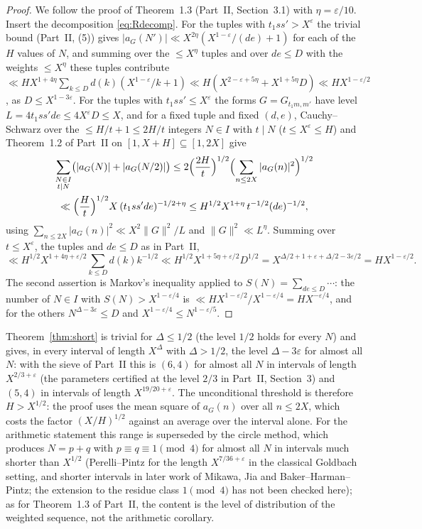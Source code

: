 \documentclass[11pt]{amsart}
\theoremstyle{remark}
\newcommand{\e}{\varepsilon}
\begin{document}
\begin{proof}
We follow the proof of Theorem~1.3 (Part~II, Section~3.1) with $\eta=\e/10$. Insert the decomposition \eqref{eq:Rdecomp}. For the tuples with $t_1ss'>X^\e$ the trivial bound (Part~II, (5)) gives $|a_G(N')|\ll X^{2\eta}(X^{1-\e}/(de)+1)$ for each of the $H$ values of $N$, and summing over the $\le X^\eta$ tuples and over $de\le D$ with the weights $\le X^\eta$ these tuples contribute $\ll HX^{1+4\eta}\sum_{k\le D}d(k)(X^{1-\e}/k+1)\ll H(X^{2-\e+5\eta}+X^{1+5\eta}D)\ll HX^{1-\e/2}$, as $D\le X^{1-3\e}$. For the tuples with $t_1ss'\le X^\e$ the forms $G=G_{t_1m,m'}$ have level $L=4t_1ss'de\le4X^\e D\le X$, and for a fixed tuple and fixed $(d,e)$, Cauchy--Schwarz over the $\le H/t+1\le2H/t$ integers $N\in I$ with $t\mid N$ ($t\le X^\e\le H$) and Theorem~1.2 of Part~II on $[1,X+H]\subseteq[1,2X]$ give
\begin{multline*}
\sum_{\substack{N\in I\\ t\mid N}}\bigl(|a_G(N)|+|a_G(N/2)|\bigr)\le2\Bigl(\frac{2H}t\Bigr)^{1/2}\Bigl(\sum_{n\le2X}|a_G(n)|^2\Bigr)^{1/2}\\
\ll\Bigl(\frac Ht\Bigr)^{1/2}X\,(t_1ss'de)^{-1/2+\eta}\le H^{1/2}X^{1+\eta}\,t^{-1/2}(de)^{-1/2},
\end{multline*}
using $\sum_{n\le2X}|a_G(n)|^2\ll X^2\|G\|^2/L$ and $\|G\|^2\ll L^{\eta}$. Summing over $t\le X^\e$, the tuples and $de\le D$ as in Part~II,
\[
\ll H^{1/2}X^{1+4\eta+\e/2}\sum_{k\le D}d(k)k^{-1/2}\ll H^{1/2}X^{1+5\eta+\e/2}D^{1/2}=X^{\Delta/2+1+\e+\Delta/2-3\e/2}=HX^{1-\e/2}.
\]
The second assertion is Markov's inequality applied to $S(N)=\sum_{de\le D}\cdots$: the number of $N\in I$ with $S(N)>X^{1-\e/4}$ is $\ll HX^{1-\e/2}/X^{1-\e/4}=HX^{-\e/4}$, and for the others $N^{\Delta-3\e}\le D$ and $X^{1-\e/4}\le N^{1-\e/5}$.
\end{proof}

Theorem~\ref{thm:short} is trivial for $\Delta\le1/2$ (the level $1/2$ holds for every $N$) and gives, in every interval of length $X^\Delta$ with $\Delta>1/2$, the level $\Delta-3\e$ for almost all $N$: with the sieve of Part~II this is $(6,4)$ for almost all $N$ in intervals of length $X^{2/3+\e}$ (the parameters certified at the level $2/3$ in Part~II, Section~3) and $(5,4)$ in intervals of length $X^{19/20+\e}$. The unconditional threshold is therefore $H>X^{1/2}$: the proof uses the mean square of $a_G(n)$ over all $n\le2X$, which costs the factor $(X/H)^{1/2}$ against an average over the interval alone. For the arithmetic statement this range is superseded by the circle method, which produces $N=p+q$ with $p\equiv q\equiv1\pmod 4$ for almost all $N$ in intervals much shorter than $X^{1/2}$ (Perelli--Pintz \cite{PP} for the length $X^{7/36+\e}$ in the classical Goldbach setting, and shorter intervals in later work of Mikawa, Jia and Baker--Harman--Pintz; the extension to the residue class $1\pmod4$ has not been checked here); as for Theorem~1.3 of Part~II, the content is the level of distribution of the weighted sequence, not the arithmetic corollary.
\end{document}
